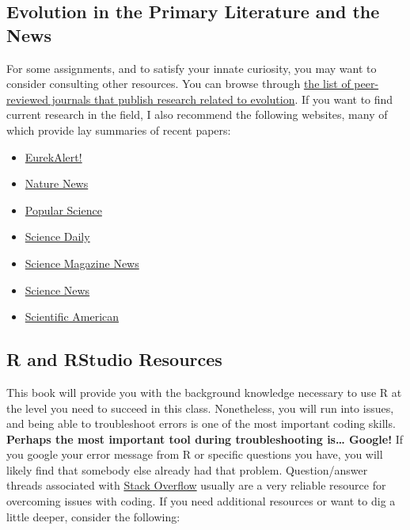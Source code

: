 \documentclass[
]{book}
\begin{document}
\hypertarget{evolution-in-the-primary-literature-and-the-news}{%
\subsection{Evolution in the Primary Literature and the News}\label{evolution-in-the-primary-literature-and-the-news}}

For some assignments, and to satisfy your innate curiosity, you may want to consider consulting other resources. You can browse through \href{http://evolution-textbook.org/content/free/notes/box_journal_list.html}{the list of peer-reviewed journals that publish research related to evolution}. If you want to find current research in the field, I also recommend the following websites, many of which provide lay summaries of recent papers:

\begin{itemize}
\item
  \href{https://www.eurekalert.org/}{EurekAlert!}
\item
  \href{https://www.nature.com/news}{Nature News}
\item
  \href{https://www.popsci.com/}{Popular Science}
\item
  \href{https://www.sciencedaily.com/}{Science Daily}
\item
  \href{https://www.sciencemag.org/news}{Science Magazine News}
\item
  \href{https://www.sciencenews.org/}{Science News}
\item
  \href{https://www.scientificamerican.com/}{Scientific American}
\end{itemize}

\hypertarget{r-and-rstudio-resources}{%
\subsection{R and RStudio Resources}\label{r-and-rstudio-resources}}

This book will provide you with the background knowledge necessary to use R at the level you need to succeed in this class. Nonetheless, you will run into issues, and being able to troubleshoot errors is one of the most important coding skills. \textbf{Perhaps the most important tool during troubleshooting is\ldots{} Google!} If you google your error message from R or specific questions you have, you will likely find that somebody else already had that problem. Question/answer threads associated with \href{https://stackoverflow.com/}{Stack Overflow} usually are a very reliable resource for overcoming issues with coding. If you need additional resources or want to dig a little deeper, consider the following:
\end{document}
